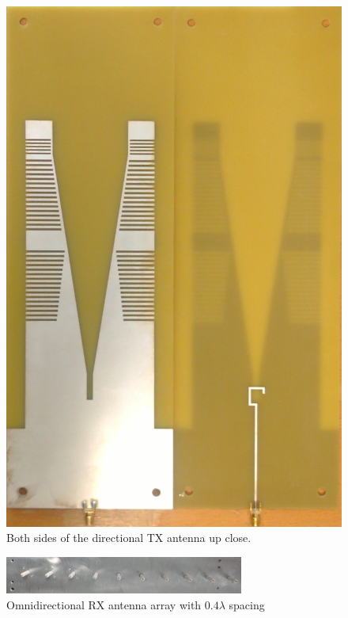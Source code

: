 \begin{figure}[H]
\begin{minipage}[H]{0.4\textwidth}
    \includegraphics[width=\textwidth]{pictures/Measurement/dirrecional_antenna.jpg}
    \caption{Both sides of the directional TX antenna up close.}
  \end{minipage}
\end{figure}


\begin{figure}[H]
\centering
\includegraphics[width=0.7\textwidth]{pictures/Measurement/antenna_array.jpg}
    \caption{Omnidirectional RX antenna array with $0.4 \lambda$ spacing}
\end{figure}


